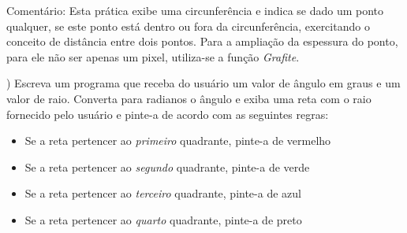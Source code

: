 \begin{renumerate}
  \label{ex:cap01_ex22}

  Comentário: Esta prática exibe uma circunferência e indica se dado um ponto qualquer, se este ponto está dentro ou fora da circunferência, exercitando o conceito de distância entre dois pontos. Para a ampliação da espessura do ponto, para ele não ser apenas um pixel, utiliza-se a função \emph{Grafite}.

%

\item)
Escreva um programa que receba do usuário um valor de ângulo em graus e um valor de raio. Converta para radianos o ângulo e exiba uma reta com o raio fornecido pelo usuário e pinte-a de acordo com as seguintes regras:
    \begin{itemize}
    \item
    Se a reta pertencer ao \emph{primeiro} quadrante, pinte-a de vermelho
    \item
    Se a reta pertencer ao \emph{segundo} quadrante, pinte-a de verde
    \item
    Se a reta pertencer ao \emph{terceiro} quadrante, pinte-a de azul
    \item
    Se a reta pertencer ao \emph{quarto} quadrante, pinte-a de preto
    \end{itemize}
    \label{ex:cap01_ex4}


\end{renumerate}
